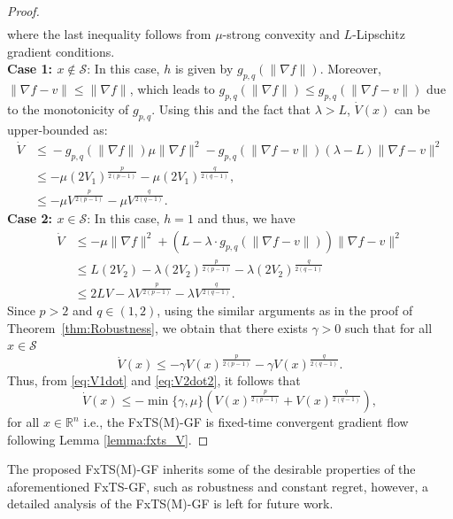 \documentclass[letterpaper]{article}
\begin{document}
\begin{proof}
\begin{align*}
    \end{align*}
    where the last inequality follows from $\mu$-strong convexity and $L$-Lipschitz gradient conditions.\\
    {\bf Case 1: $x\notin \mathcal S$}: In this case, $h$ is given by $g_{p,q}(\|\nabla\!f\|)$. Moreover, $\|\nabla\!f\!-\!v\|\leq \|\nabla f\|$, which leads to $g_{p,q}(\|\nabla\!f\|)\leq g_{p,q}(\|\nabla\!f-v\|)$ due to the monotonicity of $g_{p,q}$. Using this and the fact that $\lambda>L$, $\dot{V}(x)$ can be upper-bounded as:
    \begin{align}\label{eq:V1dot}
        \dot{V} &\leq \!-g_{p,q}(\|\!\nabla\!f\!\|)\mu\|\nabla\!f\|^2\!-\! g_{p,q}(\|\!\nabla\!f\!-\!v\|)\!(\lambda\!-\!L)\!\|\nabla\!f\!-\!v\|^2\nonumber\\
        &\leq -\mu\left(2{V_1}\right)^{\frac{p}{2(p-1)}}-\mu\left(2{V_1}\right)^{\frac{q}{2(q-1)}}, \nonumber\\
        &\leq -\mu V^{\frac{p}{2(p-1)}}-\mu V^{\frac{q}{2(q-1)}}.
    \end{align}
    {\bf Case 2: $x\in \mathcal S$}: In this case, $h=1$ and thus, we have
    \begin{align}\label{eq:V2dot}
        \dot{V} &\leq -\mu\|\nabla\!f\|^2 + \left(L-\lambda\!\cdot\!g_{p,q}(\|\nabla\!f\!-\!v\|)\right)\|\nabla\!f\!-\!v\|^2\nonumber\\
        &\leq L\left(2{V_2}\right) - \lambda\left(2{V_2}\right)^{\frac{p}{2(p-1)}}- \lambda\left(2{V_2}\right)^{\frac{q}{2(q-1)}}\nonumber\\
        &\leq 2LV - \lambda V^{\frac{p}{2(p-1)}}- \lambda V^{\frac{q}{2(q-1)}}.
    \end{align}
    Since $p>2$ and $q\in(1,2)$, using the similar arguments as in the proof of Theorem~\ref{thm:Robustness}, we obtain that there exists $\gamma>0$ such that for all $x\in \mathcal S$
    \begin{equation}\label{eq:V2dot2}
        \dot{V}(x) \leq -\gamma V(x)^{\frac{p}{2(p-1)}}-\gamma V(x)^{\frac{q}{2(q-1)}}.
    \end{equation}
    Thus, from \eqref{eq:V1dot} and \eqref{eq:V2dot2}, it follows that
    \begin{equation}\label{eq:finalVdot}
        \dot{V}(x) \leq -\min\{\gamma,\mu\}\left(V(x)^{\frac{p}{2(p-1)}}+V(x)^{\frac{q}{2(q-1)}}\right),
    \end{equation}
    for all $x\in \mathbb R^n$
    i.e., the FxTS(M)-GF is fixed-time convergent gradient flow following Lemma \ref{lemma:fxts_V}.
\end{proof}%
The proposed FxTS(M)-GF inherits some of the desirable properties of the aforementioned FxTS-GF, such as robustness and constant regret, however, a detailed analysis of the FxTS(M)-GF is left for future work.
\end{document}

